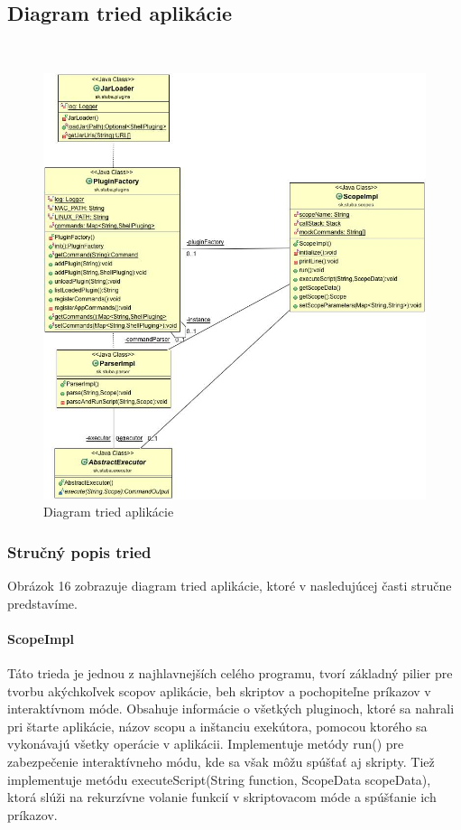 {\subsection{Diagram tried aplikácie}
 \begin{figure}[H]
	\centering
	\includegraphics[scale=0.4]{img/ClassApplication.jpg}
	\caption{Diagram tried aplikácie}
	\label{fig:test}
\end{figure}
\subsubsection{Stručný popis tried}
\indent Obrázok 16 zobrazuje diagram tried aplikácie, ktoré v nasledujúcej časti stručne predstavíme.
\paragraph{ScopeImpl}
Táto trieda je jednou z najhlavnejších celého programu, tvorí základný pilier pre tvorbu akýchkoľvek scopov aplikácie, beh skriptov a pochopiteľne príkazov v interaktívnom móde. Obsahuje informácie o všetkých pluginoch, ktoré sa nahrali pri štarte aplikácie, názov scopu a inštanciu exekútora, pomocou ktorého sa vykonávajú všetky operácie v aplikácii. Implementuje metódy run() pre zabezpečenie interaktívneho módu, kde sa však môžu spúšťať aj skripty. Tiež implementuje metódu executeScript(String function, ScopeData scopeData), ktorá slúži na rekurzívne volanie funkcií v skriptovacom móde a  spúšťanie ich príkazov.
}
